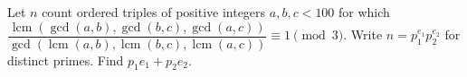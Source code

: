 Let $n$ count ordered triples of positive integers $a,b,c<100$ for which $\dfrac{\operatorname{lcm}(\gcd(a,b),\gcd(b,c),\gcd(a,c))}{\gcd(\operatorname{lcm}(a,b),\operatorname{lcm}(b,c),\operatorname{lcm}(a,c))}\equiv1\pmod3$. Write $n=p_1^{e_1}p_2^{e_2}$ for distinct primes. Find $p_1e_1+p_2e_2$.
